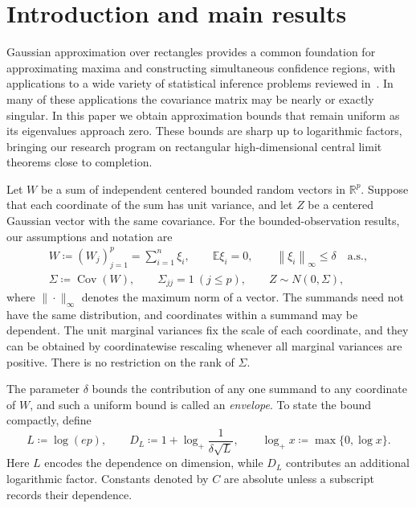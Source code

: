 \documentclass[11pt,letterpaper]{article}
\theoremstyle{remark}
\newcommand{\E}{\mathbb E}
\newcommand{\R}{\mathbb R}
\newcommand{\Cov}{\operatorname{Cov}}
\newcommand{\norm}[1]{\left\lVert#1\right\rVert}
\begin{document}
\begingroup
\setcounter{tocdepth}{1}
\small
\makeatletter
\patchcmd{\l@section}{1.0em \@plus\p@}{0.5em \@plus\p@}{}{}
\makeatother
\tableofcontents
\endgroup
\clearpage

\section{\texorpdfstring{Introduction and main results}{Introduction and main results}}\label{sec:results}
Gaussian approximation over rectangles provides a common foundation for
approximating maxima and constructing simultaneous confidence regions, with
applications to a wide variety of statistical inference problems reviewed in~\cite{CCKK2023}.
In many of these applications the {covariance} matrix may be nearly or
exactly singular. {In this paper we obtain} approximation bounds that remain uniform
as its eigenvalues approach zero. {These bounds are sharp up to
logarithmic factors, bringing our research program on rectangular
high-dimensional central limit theorems close to completion.}

Let \(W\) be a sum of independent centered bounded random vectors in
\(\R^p\). Suppose that each coordinate of the sum has unit variance,
and let \(Z\) be a centered Gaussian vector with the same covariance.
For the bounded-observation results, our assumptions and notation are
\begin{equation}
 \begin{gathered}
 W\coloneqq (W_j)_{j=1}^p=\sum_{i=1}^n\xi_i,\qquad
 \E\xi_i=0,\qquad \norm{\xi_i}_\infty\le\delta\quad\text{a.s.},\\
 \Sigma\coloneqq \Cov(W),\qquad\Sigma_{jj}=1\ (j\le p),
 \qquad Z\sim N(0,\Sigma),
 \end{gathered}
 \label{eq:setup}
\end{equation}
where $\|\cdot\|_\infty$ denotes the maximum norm of a vector. 
The summands need not have the same distribution, and coordinates within
a summand may be dependent. The unit marginal variances fix the scale
of each coordinate, and they can be obtained by coordinatewise rescaling
whenever all marginal variances are positive. There is no
restriction on the rank of \(\Sigma\).

The parameter \(\delta\) bounds the contribution of any one summand
to any coordinate of \(W\), and such a uniform bound is called an
\emph{envelope}. To state the
bound compactly, {define}
\[
 L\coloneqq \log(ep),\qquad
 D_L\coloneqq 1+\log_+\frac1{\delta\sqrt L},\qquad
 \log_+x\coloneqq \max\{0,\log x\}.
\]
Here \(L\) encodes the dependence on dimension, while \(D_L\)
contributes an additional logarithmic factor. Constants denoted by
\(C\) are absolute unless a subscript records their dependence.
\end{document}
